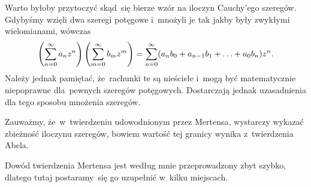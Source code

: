 \documentclass[a4paper,11pt]{article}
\begin{document}
\vspace{\spaceFour}


\start {} Warto byłoby przytoczyć skąd~się bierze wzór na
iloczyn Cauchy'ego szeregów. Gdybyśmy wzięli dwa szeregi potęgowe
i~mnożyli je tak jakby były zwykłymi wielomianami, wówczas
\begin{equation}
  \label{eq:Leja-11}
  \begin{split}
    \left( \sum\limits_{ n = 0 }^{ \infty } a_{ n } z^{ n } \right) \left(
      \sum\limits_{ m = 0 }^{ \infty } b_{ m } z^{ m } \right) = \sum\limits_{ n = 0
    }^{ \infty } ( a_{ n } b_{ 0 } + a_{ n - 1 } b_{ 1 } + \ldots + a_{ 0
    } b_{ n } ) z^{ n }.
  \end{split}
\end{equation}
Należy jednak pamiętać, że~rachunki te są nieścisłe i~mogą być
matematycznie niepoprawne dla~pewnych szeregów potęgowych. Dostarczają
jednak uzasadnienia dla tego sposobu mnożenia szeregów.

\vspace{\spaceFour}


\start {} Zauważmy, że~w~twierdzeniu udowodnionym przez
Mertensa, wystarczy wykazać zbieżność iloczynu szeregów, bowiem
wartość tej granicy wynika z~twierdzenia Abela.

\vspace{\spaceFour}


\start {} Dowód twierdzenia Mertensa jest według mnie
przeprowadzony zbyt szybko, dlatego tutaj postaramy~się go uzupełnić
w~kilku miejscach.
\end{document}

